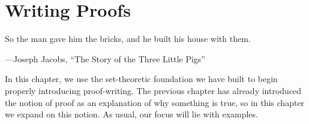 \documentclass[../notes.tex]{subfiles}
\begin{document}
\chapter{Writing Proofs}
\epigraph{So the man gave him the bricks, and he built his house with them.}
{---Joseph Jacobs, ``The Story of the Three Little Pigs'' \cite{english-fairy-tales}}
In this chapter, we use the set-theoretic foundation we have built to begin properly introducing proof-writing. The previous chapter has already introduced the notion of proof as an explanation of why something is true, so in this chapter we expand on this notion. As usual, our focus will lie with examples.


% 



\end{document}
